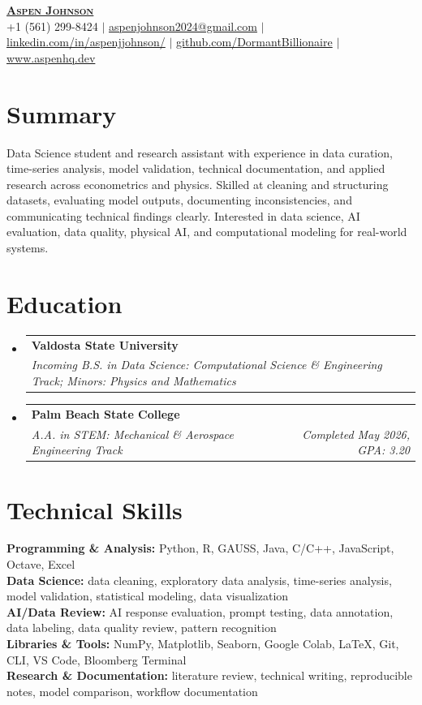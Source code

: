 \documentclass[letterpaper,11pt]{article}
\makeatletter
\newcommand{\resumeEducationEntry}[3]{
  \vspace{-2pt}\item
    \begin{tabular*}{0.97\textwidth}[t]{l@{\extracolsep{\fill}}r}
      \textbf{#1} & \\
      \textit{\small#2} & \textit{\small #3} \hfill
    \end{tabular*}\vspace{-4pt}
}
\newcommand{\resumeSubHeadingListStart}{\begin{itemize}[leftmargin=0.15in, label={}]}
\newcommand{\resumeSubHeadingListEnd}{\end{itemize}}
\makeatother
\begin{document}
\begin{center}
    \textbf{\Huge \scshape \underline{Aspen Johnson}} \\ \vspace{5pt}
    \small +1 (561) 299-8424 $|$ \href{mailto:aspenjohnson2024@gmail.com}{aspenjohnson2024@gmail.com} $|$
    \href{https://www.linkedin.com/in/aspenjjohnson/}{linkedin.com/in/aspenjjohnson/} $|$
    \href{https://github.com/DormantBillionaire}{github.com/DormantBillionaire} $|$
    \href{https://www.aspenhq.dev/}{www.aspenhq.dev}
\end{center}

\section{Summary}
  Data Science student and research assistant with experience in data curation, time-series analysis, model validation, technical documentation, and applied research across econometrics and physics. Skilled at cleaning and structuring datasets, evaluating model outputs, documenting inconsistencies, and communicating technical findings clearly. Interested in data science, AI evaluation, data quality, physical AI, and computational modeling for real-world systems.

\section{Education}
  \resumeSubHeadingListStart
    \resumeEducationEntry
      {Valdosta State University}
      {Incoming B.S. in Data Science: Computational Science \& Engineering Track; Minors: Physics and Mathematics}
      {}

    \resumeEducationEntry
      {Palm Beach State College}
      {A.A. in STEM: Mechanical \& Aerospace Engineering Track}
      {Completed May 2026, GPA: 3.20}
  \resumeSubHeadingListEnd

\section{Technical Skills}
{\small
\textbf{Programming \& Analysis:} Python, R, GAUSS, Java, C/C++, JavaScript, Octave, Excel \\
\textbf{Data Science:} data cleaning, exploratory data analysis, time-series analysis, model validation, statistical modeling, data visualization \\
\textbf{AI/Data Review:} AI response evaluation, prompt testing, data annotation, data labeling, data quality review, pattern recognition \\
\textbf{Libraries \& Tools:} NumPy, Matplotlib, Seaborn, Google Colab, \LaTeX, Git, CLI, VS Code, Bloomberg Terminal \\
\textbf{Research \& Documentation:} literature review, technical writing, reproducible notes, model comparison, workflow documentation
}
\vspace{2pt}
\end{document}
